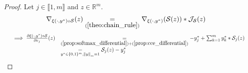 \documentclass[11pt,en]{elegantpaper}
\newcommand{\norm}[1]{\left\lVert#1\right\rVert}
\newcommand{\Real}{\mathbb{R}}
\begin{document}
\begin{proof}
  Let $j \in \llbracket 1,m \rrbracket$ and $z \in \Real^m$. \begin{equation*}
    \begin{gathered}
      \nabla_{\xi(\cdot,y^*) \circ \mathcal{S}}(z) \underset{(\ref{theo:chain_rule})}{=} \nabla_{\xi(\cdot,y^*)}(\mathcal{S}(z)) * \mathcal{J}_{\mathcal{S}}(z)
    \end{gathered}
  \end{equation*}
  \begin{equation*}
    \begin{array}{lll}
      & \implies \frac{\partial \xi(\cdot,y^*) \circ \mathcal{S}}{\partial e_j} (z)
        & \underset{(\ref{prop:softmax_differential}) + (\ref{prop:cce_differential})}= - y_j^* + \sum_{k=1}^m {y_k^* * \mathcal{S}_j(z)} \\
      & & \underset{y^* \in \{0,1\}^m, \norm{y}_m = 1}{=} \mathcal{S}_j(z) - y_j^*
    \end{array}
  \end{equation*}
\end{proof}
\end{document}
